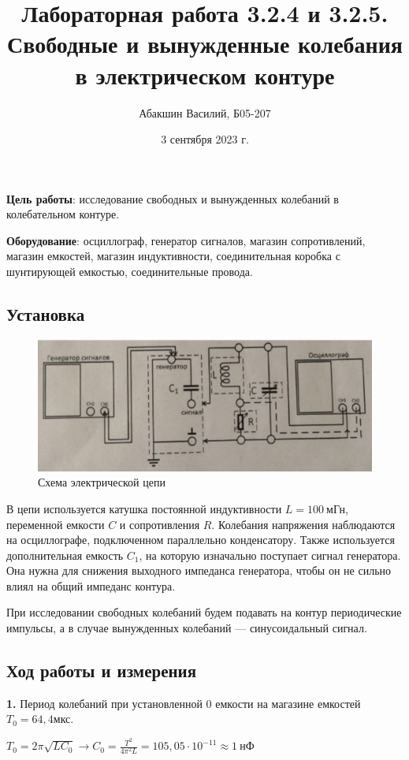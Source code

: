 \documentclass[a4paper, 12pt]{article}
\title{Лабораторная работа 3.2.4 и 3.2.5. \\ Свободные и вынужденные колебания в электрическом контуре}
\author{Абакшин Василий, Б05-207}
\date{3 сентября 2023 г.}
\begin{document}
	\maketitle
	\textbf{Цель работы}: исследование свободных и вынужденных колебаний в колебательном контуре.
	
	\textbf{Оборудование}: осциллограф, генератор сигналов, магазин сопротивлений, магазин емкостей, магазин индуктивности, соединительная коробка с шунтирующей емкостью, соединительные провода.
	\subsection*{Установка}
	\begin{figure}[h]
		\includegraphics[width = \textwidth]{Scheme.png}
		\caption{Схема электрической цепи}	
	\end{figure}
	
	В цепи используется катушка постоянной индуктивности $L = 100 \ \text{мГн}$, переменной емкости $C$ и сопротивления $R$. Колебания напряжения наблюдаются на осциллографе, подключенном параллельно конденсатору. Также используется дополнительная емкость $C_1$, на которую изначально поступает сигнал генератора. Она нужна для снижения выходного импеданса генератора, чтобы он не сильно влиял на общий импеданс контура. 
	
	При исследовании свободных колебаний будем подавать на контур периодические импульсы, а в случае вынужденных колебаний --- синусоидальный сигнал.
	\newpage
	
	\subsection*{Ход работы и измерения}
	
	\textbf{1.} Период колебаний при установленной 0 емкости на магазине емкостей $T_0 = 64,4 \text{мкс}$. 
	
	$T_0 = 2\pi \sqrt{LC_0} \longrightarrow C_0 = \frac{T^2}{4\pi^2L} = 105,05 \cdot 10^{-11} \approx 1 \ \text{нФ} $
	
\end{document}
